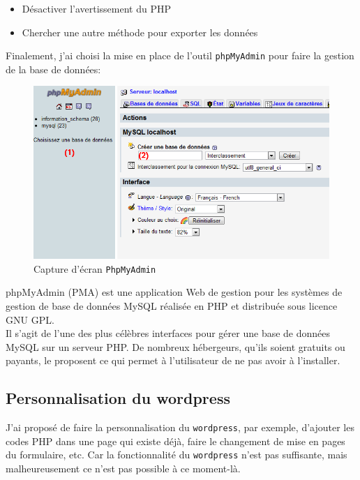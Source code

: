 \begin{itemize}
\item Désactiver l'avertissement du PHP
\item Chercher une autre méthode pour exporter les données \\
\end{itemize}

Finalement, j'ai choisi la mise en place de l'outil \texttt{phpMyAdmin} pour faire la gestion de la base de données:\\

\begin{figure}
\centering
\includegraphics[scale=0.4]{images/phpmyadmin}
\caption{Capture d'écran \texttt{PhpMyAdmin}}
\end{figure}

phpMyAdmin (PMA) est une application Web de gestion pour les systèmes de gestion de base de données MySQL réalisée en PHP et distribuée sous licence GNU GPL.\\

Il s'agit de l'une des plus célèbres interfaces pour gérer une base de données MySQL sur un serveur PHP. De nombreux hébergeurs, qu'ils soient gratuits ou payants, le proposent ce qui permet à l'utilisateur de ne pas avoir à l'installer.\\

\subsection{Personnalisation du wordpress}
\label{code}
J'ai proposé de faire la personnalisation du \texttt{wordpress}, par exemple, d'ajouter les codes PHP dans une page qui existe déjà, faire le changement de mise en pages du formulaire, etc. Car la fonctionnalité du \texttt{wordpress} n'est pas suffisante, mais malheureusement ce n'est pas possible à ce moment-là. \\


